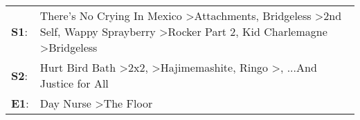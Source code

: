 \begin{supertabular}{p{0.03\textwidth}p{0.92\textwidth}}
 \textbf{S1}:  &  There's No Crying In Mexico\textsuperscript{} \textgreater \enspace Attachments\textsuperscript{}, \enspace Bridgeless\textsuperscript{} \textgreater \enspace 2nd Self\textsuperscript{}, \enspace Wappy Sprayberry\textsuperscript{} \textgreater \enspace Rocker Part 2\textsuperscript{}, \enspace Kid Charlemagne\textsuperscript{} \textgreater \enspace Bridgeless\textsuperscript{}  \enspace  \\
 \textbf{S2}:  &                                                                                        Hurt Bird Bath\textsuperscript{} \textgreater \enspace 2x2\textsuperscript{}, \textsuperscript{} \textgreater \enspace Hajimemashite\textsuperscript{}, \enspace Ringo\textsuperscript{} \textgreater {}\textsuperscript{}, \enspace ...And Justice for All\textsuperscript{}  \enspace  \\
 \textbf{E1}:  &                                                                                                                                                                                                                                                                                                                Day Nurse\textsuperscript{} \textgreater \enspace The Floor\textsuperscript{}  \enspace  \\
\end{supertabular}
